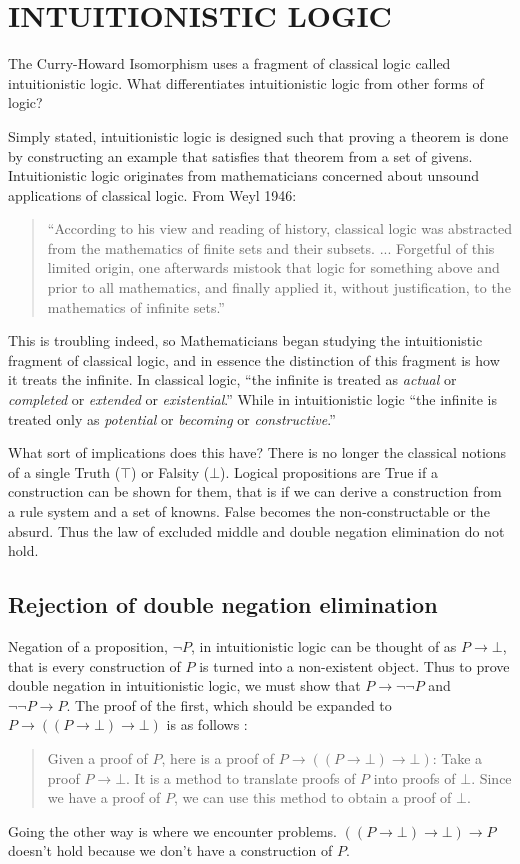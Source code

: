 \chapter{INTUITIONISTIC LOGIC}\label{ch:logic}
The Curry-Howard Isomorphism uses a fragment of classical logic called intuitionistic logic. What differentiates intuitionistic logic from other forms of logic?

Simply stated, intuitionistic logic is designed such that proving a theorem is done by constructing an example that satisfies that theorem from a set of givens. Intuitionistic logic originates from mathematicians concerned about unsound applications of classical logic. From Weyl 1946:
\begin{quote}
``According to his view and reading of history, classical logic was abstracted from the mathematics of finite sets and their subsets. ... Forgetful of this limited origin, one afterwards mistook that logic for something above and prior to all mathematics, and finally applied it, without justification, to the mathematics of infinite sets.''
\end{quote}

This is troubling indeed, so Mathematicians began studying the intuitionistic fragment of classical logic, and in essence the distinction of this fragment is how it treats the infinite.
In classical logic, ``the infinite is treated as \emph{actual} or \emph{completed} or \emph{extended} or \emph{existential}.'' While in intuitionistic logic ``the infinite is treated only as \emph{potential} or \emph{becoming} or \emph{constructive}.'' \cite{metamath}

What sort of implications does this have? There is no longer the classical notions of a single Truth ($\top$) or Falsity ($\bot$). Logical propositions are True if a construction can be shown for them, that is if we can derive a construction from a rule system and a set of knowns. False becomes the non-constructable or the absurd. Thus the law of excluded middle and double negation elimination do not hold.

\section{Rejection of double negation elimination}
Negation of a proposition, $\neg P$, in intuitionistic logic can be thought of as $P \rightarrow \bot$, that is every construction of $P$ is turned into a non-existent object. Thus to prove double negation in intuitionistic logic, we must show that $P \rightarrow \neg \neg P$ and $\neg \neg P \rightarrow P$. The proof of the first, which should be expanded to $P \rightarrow ((P \rightarrow \bot) \rightarrow \bot)$ is as follows :
\begin{quote}
Given a proof of $P$, here is a proof of $P \rightarrow ((P \rightarrow \bot) \rightarrow \bot)$: Take a proof $P \rightarrow \bot$. It is a method to translate proofs of $P$ into proofs of $\bot$. Since we have a proof of $P$, we can use this method to obtain a proof of $\bot$. \cite{CHnotes}
\end{quote}
Going the other way is where we encounter problems. $((P \rightarrow \bot) \rightarrow \bot) \rightarrow P$ doesn't hold because we don't have a construction of $P$.

